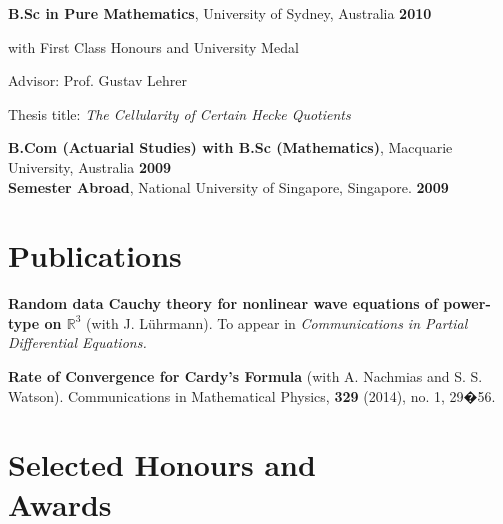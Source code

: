 \documentclass[margin,line]{resume}
\begin{document}
\begin{resume}
    \vspace{-2.5mm}
    \textbf{B.Sc in Pure Mathematics}, University of Sydney, Australia \vspace{1mm} \hfill \textbf{2010}\\%

\vspace{-3mm}
    \begin{list2}
        \item with First Class Honours and University Medal
        \item Advisor: Prof. Gustav Lehrer
        \item Thesis title: \emph{The Cellularity of Certain Hecke Quotients}
    \end{list2}

    
    \vspace{-2.5mm}
    \textbf{B.Com (Actuarial Studies) with B.Sc (Mathematics)}, Macquarie University, Australia \vspace{1mm} \hfill \textbf{2009}\\%

    \vspace{-2.5mm}
    \textbf{Semester Abroad}, National University of Singapore, Singapore. \vspace{1mm} \hfill \textbf{2009}

\vspace{2mm}
        \section{\mysidestyle Publications}
        
\noindent \textbf{Random data Cauchy theory for nonlinear wave equations of power-type on $\mathbb{R}^3$} (with J. L\"uhrmann). To appear in \textit{Communications in Partial Differential Equations.} 

\noindent \textbf{Rate of Convergence for Cardy's Formula} (with A. Nachmias and S. S. Watson). Communications in Mathematical Physics, \textbf{329} (2014), no. 1, 29�56. 

\vspace{2mm}%
    \section{\mysidestyle Selected Honours and\\Awards} 
           

\end{resume}
\end{document}
